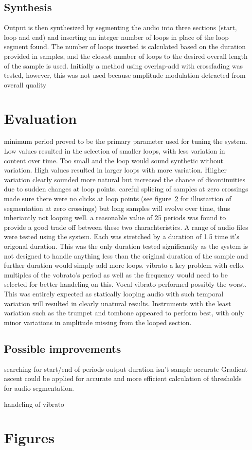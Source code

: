 \documentclass[titlepage]{scrartcl}
\begin{document}
\subsection{Synthesis}
Output is then synthesized by segmenting the audio into three sections (start,
loop and end) and inserting an integer number of loops in place of
the loop segment found. The number of loops inserted is calculated based on the
duration provided in samples, and the closest number of loops to the desired
overall length of the sample is used.
Initially a method using overlap-add with crossfading was tested, however, this
was not used because amplitude modulation detracted from overall quality


\section{Evaluation}
minimum period proved to be the primary parameter used for tuning the system.
Low values resulted in the selection of smaller loops, with less variation in
content over time. Too small and the loop would sound synthetic without
variation. High values resulted in larger loops with more variation. Hiigher
variation clearly sounded more natural but increased the chance of
dicontinuities due to sudden changes at loop points. careful splicing of
samples at zero crossings made sure there were no clicks at loop points (see
figure~\ref{} for illustartion of segmentation at zero crossings) but
long samples will evolve over time, thus inheriantly not looping well.
a reasonable value of 25 periods was found to provide a good trade off between
these two charachteristics.
A range of audio files were tested using the system. Each was stretched by a
duration of 1.5 time it's origonal duration. This was the only duration tested
significantly as the system is not designed to handle anything less than the
original duration of the sample and further duration would simply add more
loops.
vibrato a key problem with cello. multiples of the vobrato's period as well as
the frequency would need to be selected for better handeling on this. 
Vocal vibrato performed possibly the worst. This was entirely expected as
statically looping audio with such temporal variation will resulted in clearly
unatural results.
Instruments with the least variation such as the trumpet and tombone appeared
to perform best, with only minor variations in amplitude missing from the
looped section.

\subsection{Possible improvements}
searching for start/end of periods
output duration isn't sample accurate
Gradient ascent could be applied for accurate and more efficient calculation
of thresholds for audio segmentation.

handeling of vibrato

\section{Figures}
\end{document}
